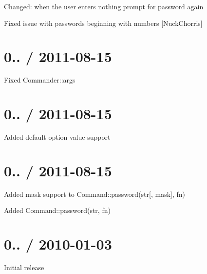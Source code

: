 \begin{DoxyItemize}
\item Changed\+: when the user enters nothing prompt for password again
\item Fixed issue with passwords beginning with numbers \mbox{[}Nuck\+Chorris\mbox{]}
\end{DoxyItemize}

\section*{0.. / 2011-\/08-\/15 }


\begin{DoxyItemize}
\item Fixed {\ttfamily Commander\+::args}
\end{DoxyItemize}

\section*{0.. / 2011-\/08-\/15 }


\begin{DoxyItemize}
\item Added default option value support
\end{DoxyItemize}

\section*{0.. / 2011-\/08-\/15 }


\begin{DoxyItemize}
\item Added mask support to {\ttfamily Command\+::password(str\mbox{[}, mask\mbox{]}, fn)}
\item Added {\ttfamily Command\+::password(str, fn)}
\end{DoxyItemize}

\section*{0.. / 2010-\/01-\/03 }


\begin{DoxyItemize}
\item Initial release 
\end{DoxyItemize}